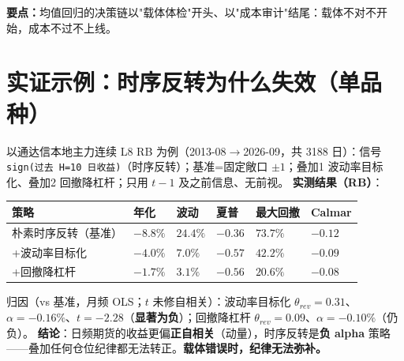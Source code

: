 \documentclass[UTF8,11pt]{ctexart}
\newcommand{\takeaway}[1]{\medskip\par\noindent\textbf{要点：}#1\par\medskip}
\begin{document}
\takeaway{均值回归的决策链以"载体体检"开头、以"成本审计"结尾：载体不对不开始，成本不过不上线。}

\section{实证示例：时序反转为什么失效（单品种）}
以通达信本地主力连续 L8 RB 为例（2013-08$\to$2026-09，共 3188 日）：信号 \texttt{sign(过去 H=10 日收益)}（时序反转）；基准=固定敞口 $\pm1$；叠加1 波动率目标化、叠加2 回撤降杠杆；只用 $t-1$ 及之前信息、无前视。
\textbf{实测结果（RB）}：
\begin{center}
\setlength{\tabcolsep}{4pt}
\renewcommand{\arraystretch}{1.35}
\begin{tabular}{@{}>{\raggedright\arraybackslash}p{4.2cm}>{\raggedright\arraybackslash}p{1.3cm}>{\raggedright\arraybackslash}p{1.3cm}>{\raggedright\arraybackslash}p{1.2cm}>{\raggedright\arraybackslash}p{1.6cm}>{\raggedright\arraybackslash}p{1.3cm}@{}}
\toprule
策略 & 年化 & 波动 & 夏普 & 最大回撤 & Calmar \\
\midrule
朴素时序反转（基准） & $-8.8\%$ & $24.4\%$ & $-0.36$ & $73.7\%$ & $-0.12$ \\
+波动率目标化 & $-4.0\%$ & $7.0\%$ & $-0.57$ & $42.2\%$ & $-0.09$ \\
+回撤降杠杆 & $-1.7\%$ & $3.1\%$ & $-0.56$ & $20.6\%$ & $-0.08$ \\
\bottomrule
\end{tabular}
\end{center}
归因（vs 基准，月频 OLS；$t$ 未修自相关）：波动率目标化 $\theta_{rev}=0.31$、$\alpha=-0.16\%$、$t=-2.28$（\textbf{显著为负}）；回撤降杠杆 $\theta_{rev}=0.09$、$\alpha=-0.10\%$（仍负）。
\textbf{结论}：日频期货的收益更偏\textbf{正自相关}（动量），时序反转是\textbf{负 alpha} 策略——叠加任何仓位纪律都无法转正。\textbf{载体错误时，纪律无法弥补。}
\end{document}
